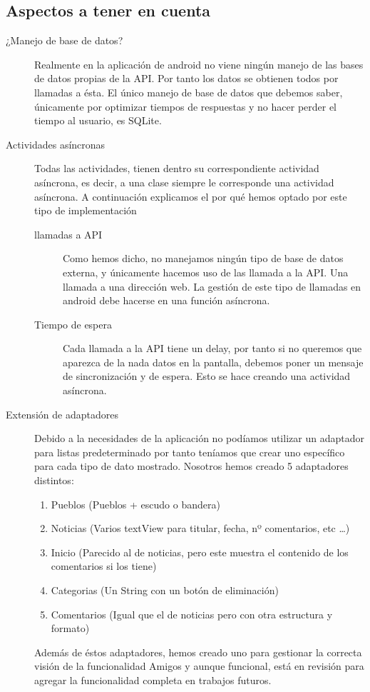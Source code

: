 \subsection{Aspectos a tener en cuenta}
	\begin{description}
	\item[¿Manejo de base de datos?]
		Realmente en la aplicación de android no viene ningún manejo de las bases de datos propias de la API. Por tanto los datos se obtienen todos por llamadas a ésta. El único manejo de base de datos que debemos saber, únicamente por optimizar tiempos de respuestas y no hacer perder el tiempo al usuario, es SQLite.
	\item[Actividades asíncronas]
		Todas las actividades, tienen dentro su correspondiente actividad asíncrona, es decir, a una clase siempre le corresponde una actividad asíncrona. A continuación explicamos el por qué hemos optado por este tipo de implementación
		\begin{description}
			\item[llamadas a API]
			Como hemos dicho, no manejamos ningún tipo de base de datos externa, y únicamente hacemos uso de las llamada a la API. Una llamada a una dirección web. La gestión de este tipo de llamadas en android debe hacerse en una función asíncrona. 
			\item[Tiempo de espera]
				Cada llamada a la API tiene un delay, por tanto si no queremos que aparezca de la nada datos en la pantalla, debemos poner un mensaje de sincronización y de espera. Esto se hace creando una actividad asíncrona.
		\end{description}
	\item[Extensión de adaptadores]
		Debido a la necesidades de la aplicación no podíamos utilizar un adaptador para listas predeterminado por tanto teníamos que crear uno específico para cada tipo de dato mostrado. Nosotros hemos creado 5 adaptadores distintos:
		\begin{enumerate}
			\item Pueblos (Pueblos + escudo o bandera)
			\item Noticias (Varios textView para titular, fecha, nº comentarios, etc \ldots)
			\item Inicio (Parecido al de noticias, pero este muestra el contenido de los comentarios si los tiene)
			\item Categorias (Un String con un botón de eliminación)
			\item Comentarios (Igual que el de noticias pero con otra estructura y formato)
		\end{enumerate}

Además de éstos adaptadores, hemos creado uno para gestionar la correcta visión de la funcionalidad Amigos y aunque funcional, está en revisión para agregar la funcionalidad completa en trabajos futuros.
	\end{description}


